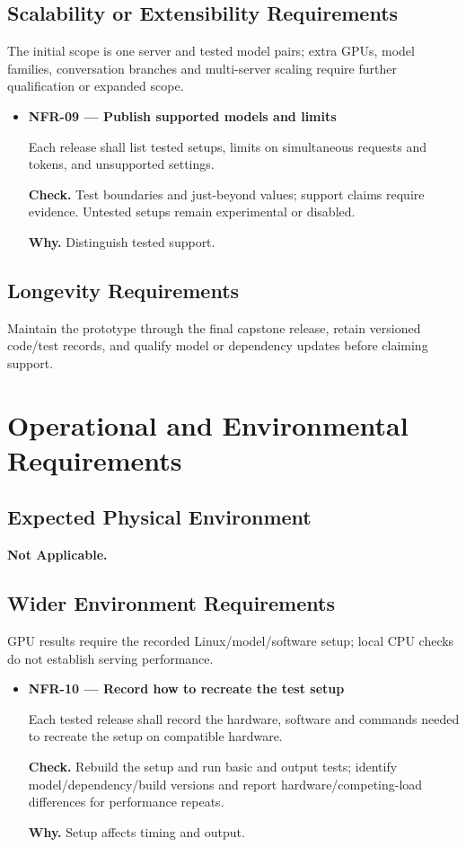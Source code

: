 \documentclass[12pt]{article}
\begin{document}
\subsection{Scalability or Extensibility Requirements}
The initial scope is one server and tested model pairs; extra GPUs, model families, conversation branches and multi-server scaling require further qualification or expanded scope.

\begin{itemize}
\item {}\label{req:NFR-09}
\textbf{NFR-09 --- Publish supported models and limits}\par
Each release shall list tested setups, limits on simultaneous requests and tokens, and unsupported settings.\par
\textbf{Check.} Test boundaries and just-beyond values; support claims require evidence. Untested setups remain experimental or disabled.\par
\textbf{Why.} Distinguish tested support.
\end{itemize}

\subsection{Longevity Requirements}
Maintain the prototype through the final capstone release, retain versioned
code/test records, and qualify model or dependency updates before claiming support.


\section{Operational and Environmental Requirements}


\subsection{Expected Physical Environment}
\textbf{Not Applicable.}


\subsection{Wider Environment Requirements}
GPU results require the recorded Linux/model/software setup; local CPU checks do not establish serving performance.

\begin{itemize}
\item {}\label{req:NFR-10}
\textbf{NFR-10 --- Record how to recreate the test setup}\par
Each tested release shall record the hardware, software and commands needed to recreate the setup on compatible hardware.\par
\textbf{Check.} Rebuild the setup and run basic and output tests; identify model/dependency/build versions and report hardware/competing-load differences for performance repeats.\par
\textbf{Why.} Setup affects timing and output.
\end{itemize}
\end{document}
